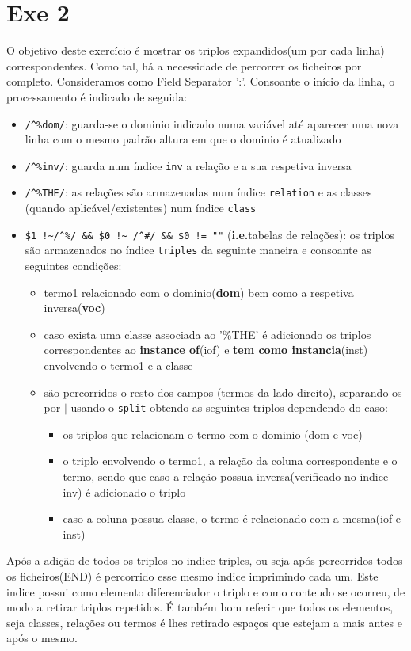 \documentclass{llncs}
\begin{document}
\section{Exe 2}
O objetivo deste exercício é mostrar os triplos expandidos(um por cada linha) correspondentes. Como tal, há a necessidade de percorrer os ficheiros por completo. Consideramos como Field Separator ':'. Consoante o início da linha, o processamento é indicado de seguida:
\begin{itemize}
    \item \verb|/^%dom/|: guarda-se o dominio indicado numa variável até aparecer uma nova linha com o mesmo padrão altura em que o dominio é atualizado
    \item \verb|/^%inv/|: guarda num índice \texttt{inv} a relação e a sua respetiva inversa
    \item \verb|/^%THE/|: as relações são armazenadas num índice \texttt{relation} e as classes (quando aplicável/existentes) num índice \texttt{class}
    \item \verb|$1 !~/^%/ && $0 !~ /^#/ && $0 != ""| (\textbf{i.e.}tabelas de relações): os triplos são armazenados no índice \texttt{triples} da seguinte maneira e consoante as seguintes condições: 
        \begin{itemize}
            \item termo1 relacionado com o dominio(\textbf{dom}) bem como a respetiva inversa(\textbf{voc})
            \item caso exista uma classe associada ao '\%THE' é adicionado os triplos correspondentes ao \textbf{instance of}(iof) e \textbf{tem como instancia}(inst) envolvendo o termo1 e a classe
            \item são percorridos o resto dos campos (termos da lado direito), separando-os por $|$ usando o \texttt{split} obtendo as seguintes triplos dependendo do caso:
                \begin{itemize}
                    \item os triplos que relacionam o termo com o dominio (dom e voc)
                    \item o triplo envolvendo o termo1, a relação da coluna correspondente e o termo, sendo que caso a relação possua inversa(verificado no indice inv) é adicionado o triplo
                    \item caso a coluna possua classe, o termo é relacionado com a mesma(iof e inst)
                \end{itemize}
        \end{itemize}
\end{itemize}
Após a adição de todos os triplos no indice triples, ou seja após percorridos todos os ficheiros(END) é percorrido esse mesmo indice imprimindo cada um. Este indice possui como elemento diferenciador o triplo e como conteudo se ocorreu, de modo a retirar triplos repetidos. É também bom referir que todos os elementos, seja classes, relações ou termos é lhes retirado espaços que estejam a mais antes e após o mesmo.
\end{document}
